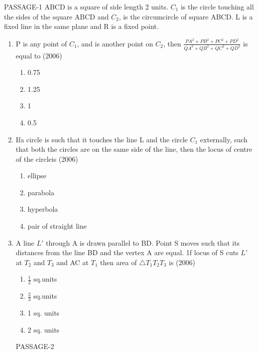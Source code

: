 \documentclass[12pt]{article}
\begin{document}
PASSAGE-1
ABCD is a square of side length 2 units. $C_1$ is the circle touching all the sides of the square ABCD and $C_2$, is the circumcircle of square ABCD. L is a fixed line in the same plane and R is a fixed point.
\begin{enumerate}
\item P is any point of $C_1$, and is another point on $C_2$, then $\frac{PA^2+PB^2+PC^2+PD^2}{QA^2+QB^2+QC^2+QD^2}$ is equal to (2006)
\begin{enumerate}
\item 0.75
\item 1.25
\item 1
\item 0.5
\end{enumerate}
\item Ifa circle is such that it touches the line L and the circle $C_1$ externally, such that both the circles are on the same side of the line, then the locus of centre of the circleis (2006)
\begin{enumerate}
\item ellipse
\item parabola
\item hyperbola
\item pair of straight line
\end{enumerate}
\item A line $L'$ through A is drawn parallel to BD. Point S moves such that its distances from the line BD and the vertex A are equal. 1f locus of S cuts $L'$ at $T_2$ and $T_3$ and AC at $T_1$ then area of $\triangle T_1T_2T_3$ is (2006)
\begin{enumerate}
\item $\frac{1}{2}$ sq.units
\item $\frac{2}{3}$ sq.units
\item 1 sq. units
\item 2 sq. units
\end{enumerate}

PASSAGE-2


\end{enumerate}
\end{document}
